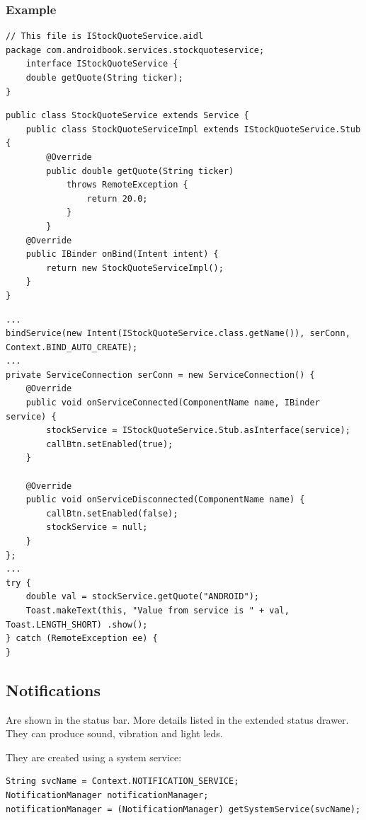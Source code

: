\subsubsection{Example}

\begin{lstlisting}[title=Service interface is defined in the AIDL file]
// This file is IStockQuoteService.aidl
package com.androidbook.services.stockquoteservice;
    interface IStockQuoteService {
    double getQuote(String ticker);
}
\end{lstlisting}

\begin{lstlisting}[title=Service must implement the interface]
public class StockQuoteService extends Service {
    public class StockQuoteServiceImpl extends IStockQuoteService.Stub {
        @Override
        public double getQuote(String ticker)
            throws RemoteException {
                return 20.0;
            }
        }
    @Override
    public IBinder onBind(Intent intent) {
        return new StockQuoteServiceImpl();
    }
}

\end{lstlisting}

\begin{lstlisting}[title=Client calling the service]
...
bindService(new Intent(IStockQuoteService.class.getName()), serConn, Context.BIND_AUTO_CREATE);
...
private ServiceConnection serConn = new ServiceConnection() {
    @Override
    public void onServiceConnected(ComponentName name, IBinder service) {
        stockService = IStockQuoteService.Stub.asInterface(service);
        callBtn.setEnabled(true);
    }

    @Override
    public void onServiceDisconnected(ComponentName name) {
        callBtn.setEnabled(false);
        stockService = null;
    }
};
...
try {
    double val = stockService.getQuote("ANDROID");
    Toast.makeText(this, "Value from service is " + val, Toast.LENGTH_SHORT) .show();
} catch (RemoteException ee) {
}
\end{lstlisting}

\subsection{Notifications}
Are shown in the status bar. More details listed in the extended status drawer. 
They can produce sound, vibration and light leds. 

They are created using a system service:
\begin{lstlisting}[title=Creating notifications]
String svcName = Context.NOTIFICATION_SERVICE;
NotificationManager notificationManager;
notificationManager = (NotificationManager) getSystemService(svcName);
\end{lstlisting}


